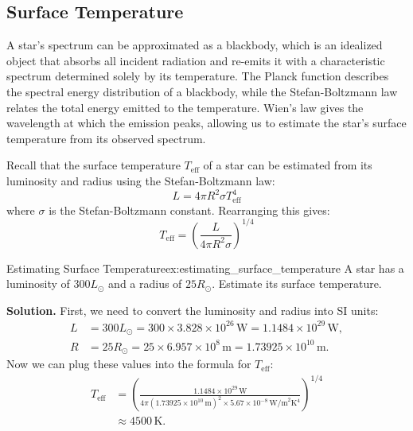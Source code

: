 \subsection{Surface Temperature}
\begin{intuition}
A star's spectrum can be approximated as a blackbody, which is an idealized object that absorbs all incident radiation and re-emits it with a characteristic spectrum determined solely by its temperature. The Planck function describes the spectral energy distribution of a blackbody, while the Stefan-Boltzmann law relates the total energy emitted to the temperature. Wien's law gives the wavelength at which the emission peaks, allowing us to estimate the star's surface temperature from its observed spectrum.
\end{intuition}


Recall that the surface temperature $T_{\text{eff}}$ of a star can be estimated from its luminosity and radius using the Stefan-Boltzmann law:
\begin{equation}
L = 4\pi R^2 \sigma T_{\text{eff}}^4
\end{equation}
where $\sigma$ is the Stefan-Boltzmann constant. Rearranging this gives:
\begin{equation}
T_{\text{eff}} = \left(\frac{L}{4\pi R^2 \sigma}\right)^{1/4}
\end{equation}
\begin{example}{Estimating Surface Temperature}{ex:estimating_surface_temperature}
A star has a luminosity of $300 L_\odot$ and a radius of $25 R_\odot$. Estimate its surface temperature.

\smallskip\textbf{Solution.}
First, we need to convert the luminosity and radius into SI units:
\begin{align*}
L &= 300 L_\odot = 300 \times 3.828 \times 10^{26}\,\text{W} = 1.1484 \times 10^{29}\,\text{W}, \\
R &= 25 R_\odot = 25 \times 6.957 \times 10^8\,\text{m} = 1.73925 \times 10^{10}\,\text{m}.
\end{align*}
Now we can plug these values into the formula for $T_{\text{eff}}$:
\begin{align*}
T_{\text{eff}} &= \left(\frac{1.1484 \times 10^{29}\,\text{W}}{4\pi (1.73925 \times 10^{10}\,\text{m})^2 \times 5.67 \times 10^{-8}\,\text{W/m}^2\text{K}^4}\right)^{1/4} \\
&\approx 4500\,\text{K}.
\end{align*}
\end{example}

